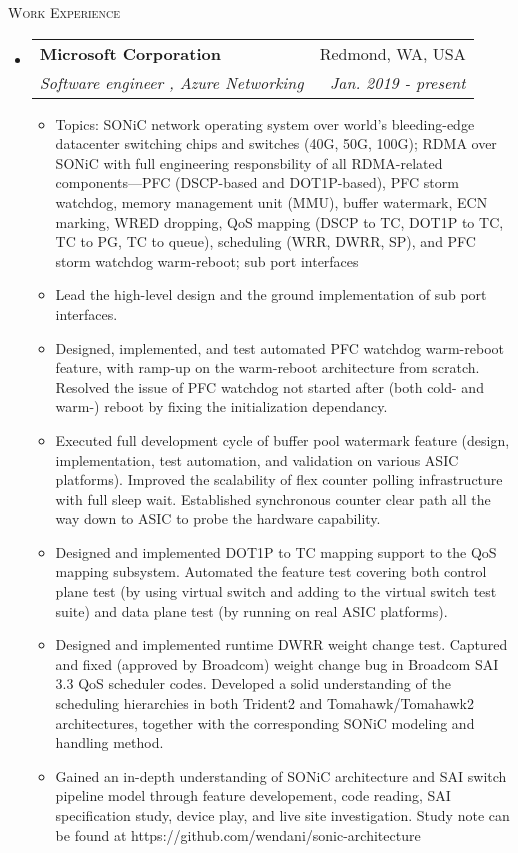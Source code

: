 \documentclass[letterpaper,11pt]{article}
\makeatletter
\newcommand{\resheading}[1]{{\noindent\large \colorbox{mygrey}{
\begin{minipage}{1.0\textwidth}{\textsc{#1 \vphantom{p\^{E}}}}\end{minipage}}}}
\newcommand{\ressubheading}[4]{
\begin{tabular*}{6.69in}{l@{\extracolsep{\fill}}r}
        \textbf{#1} & #2 \\
        \textit{#3} & \textit{#4} \\
\end{tabular*}\vspace{-6pt}
}
\newcommand{\resitem}[1]{\item #1 \vspace{-2pt}}
\makeatother
\begin{document}
\resheading{Work Experience}%
\begin{itemize}
\setlength{\itemindent}{-0.075in}

\item
  \ressubheading{Microsoft Corporation}{Redmond, WA, USA}
  {Software engineer \Romannum{2}, Azure Networking}{Jan. 2019 - present}
  \begin{itemize}
  \resitem{Topics: SONiC network operating system over world's bleeding-edge datacenter switching chips and switches (40G, 50G, 100G);
  RDMA over SONiC with full engineering responsbility of all RDMA-related components---PFC (DSCP-based and DOT1P-based), PFC storm watchdog,
  memory management unit (MMU), buffer watermark, ECN marking,
  WRED dropping, QoS mapping (DSCP to TC, DOT1P to TC, TC to PG, TC to queue), scheduling (WRR, DWRR, SP), and PFC storm watchdog warm-reboot;
  sub port interfaces}
  \resitem{Lead the high-level design and the ground implementation of sub port interfaces.}
  \resitem{Designed, implemented, and test automated PFC watchdog warm-reboot feature, with ramp-up on the
  warm-reboot architecture from scratch.
  Resolved the issue of PFC watchdog not started after (both cold- and warm-) reboot by fixing the initialization dependancy.}
  \resitem{Executed full development cycle of buffer pool watermark feature (design, implementation, test automation, and validation on various ASIC platforms).
  Improved the scalability of flex counter polling infrastructure with full sleep wait.
  Established synchronous counter clear path all the way down to ASIC to probe the hardware capability.}
  \resitem{Designed and implemented DOT1P to TC mapping support to the QoS mapping subsystem.
  Automated the feature test covering both control plane test (by using virtual switch and adding to the virtual switch test suite) and data plane
  test (by running on real ASIC platforms).}
  \resitem{Designed and implemented runtime DWRR weight change test.
  Captured and fixed (approved by Broadcom) weight change bug in Broadcom SAI 3.3 QoS scheduler codes.
  Developed a solid understanding of the scheduling hierarchies in both Trident2 and Tomahawk/Tomahawk2 architectures,
  together with the corresponding SONiC modeling and handling method.}
  \resitem{Gained an in-depth understanding of SONiC architecture and SAI switch pipeline model
  through feature developement, code reading, SAI specification study, device play, and live site investigation.
  Study note can be found at https://github.com/wendani/sonic-architecture}
  \end{itemize}


\end{itemize}
\end{document}
